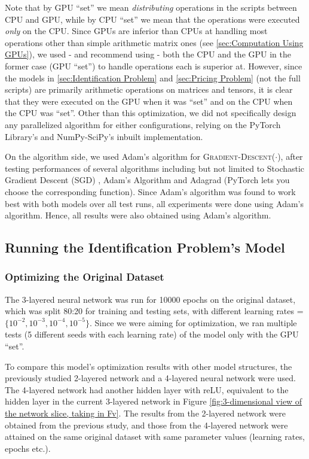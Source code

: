 \documentclass[12pt]{article}
\begin{document}
    Note that by GPU ``set'' we mean \textit{distributing} operations in the scripts between CPU and GPU, while by CPU ``set'' we mean that the operations were executed \textit{only} on the CPU. Since GPUs are inferior than CPUs at handling most operations other than simple arithmetic matrix ones (see \cref{sec:Computation Using GPUs}), we used - and recommend using - both the CPU and the GPU in the former case (GPU ``set'') to handle operations each is superior at. However, since the models in \cref{sec:Identification Problem} and \cref{sec:Pricing Problem} (not the full scripts) are primarily arithmetic operations on matrices and tensors, it is clear that they were executed on the GPU when it was ``set'' and on the CPU when the CPU was ``set''. Other than this optimization, we did not specifically design any parallelized algorithm for either configurations, relying on the PyTorch Library's and NumPy-SciPy's inbuilt implementation.
    
    On the algorithm side, we used Adam's algorithm for \textsc{Gradient-Descent}($\cdot$), after testing performances of several algorithms including but not limited to Stochastic Gradient Descent (SGD) \cite{SGD}, Adam's Algorithm \cite{Adam} and Adagrad \cite{Adagrad} (PyTorch lets you choose the corresponding function). Since Adam's algorithm was found to work best with both models over all test runs, all experiments were done using Adam's algorithm. Hence, all results were also obtained using Adam's algorithm.
    
    \subsection{Running the Identification Problem's Model} \label{sec:Running the Identification Problem's Model}
    \subsubsection{Optimizing the Original Dataset} \label{sec:Identification Problem-Optimizing the Original Dataset}
    The 3-layered neural network was run for 10000 epochs on the original dataset, which was split 80:20 for training and testing sets, with different learning rates = $\{10^{-2}, 10^{-3}, 10^{-4}, 10^{-5}\}$. Since we were aiming for optimization, we ran multiple tests (5 different seeds with each learning rate) of the model only with the GPU ``set''.
    
    To compare this model's optimization results with other model structures, the previously studied 2-layered network \cite{Xue2016Avi2} and a 4-layered neural network were used. The 4-layered network had another hidden layer with reLU, equivalent to the hidden layer in the current 3-layered network in Figure \ref{fig:3-dimensional view of the network slice, taking in Fv}. The results from the 2-layered network were obtained from the previous study, and those from the 4-layered network were attained on the same original dataset with same parameter values (learning rates, epochs etc.).
    
\end{document}
